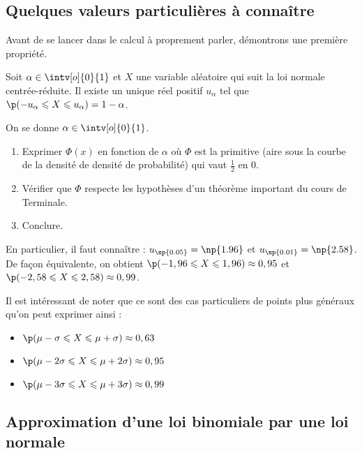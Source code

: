 \documentclass[12pt,a4paper,french]{article}
\begin{document}
\subsection{Quelques valeurs particulières à connaître}

Avant de se lancer dans le calcul à proprement parler, démontrons une
première propriété.

\begin{proposition}
  Soit $\alpha \in \intv[o]{0}{1}$ et $X$ une variable aléatoire qui suit
  la loi normale centrée-réduite. Il existe un unique réel positif
  $u_{\alpha}$ tel que $\p(-u_{\alpha} \leqslant X \leqslant u_{\alpha}) = 1
  - \alpha$.
\end{proposition}

\begin{question}
  On se donne $\alpha \in \intv[o]{0}{1}$.
  \begin{enumerate}
    \item Exprimer $\Phi(x)$ en fonction de $\alpha$ où $\Phi$ est la
      primitive (aire sous la courbe de la densité de densité de
      probabilité) qui vaut $\frac12$ en 0.
    \item Vérifier que $\Phi$ respecte les hypothèses d'un théorème
      important du cours de Terminale.
    \item Conclure.
  \end{enumerate}
\end{question}

En particulier, il faut connaître : $u_{\np{0.05}} = \np{1.96}$ et
$u_{\np{0.01}} = \np{2.58}$. De façon équivalente, on obtient $\p(-1,96
\leqslant X \leqslant 1,96) \approx 0,95$ et $\p(-2,58 \leqslant X
\leqslant 2,58) \approx 0,99$.

Il est intéressant de noter que ce sont des cas particuliers de points
plus généraux qu'on peut exprimer ainsi :
\begin{itemize}
  \item $\p(\mu - \sigma \leqslant X \leqslant \mu + \sigma) \approx
    0,63$
  \item $\p(\mu - 2\sigma \leqslant X \leqslant \mu + 2\sigma) \approx
    0,95$
  \item $\p(\mu - 3\sigma \leqslant X \leqslant \mu + 3\sigma) \approx
    0,99$
\end{itemize}

\pagebreak

\subsection{Approximation d'une loi binomiale par une loi normale}
\end{document}
